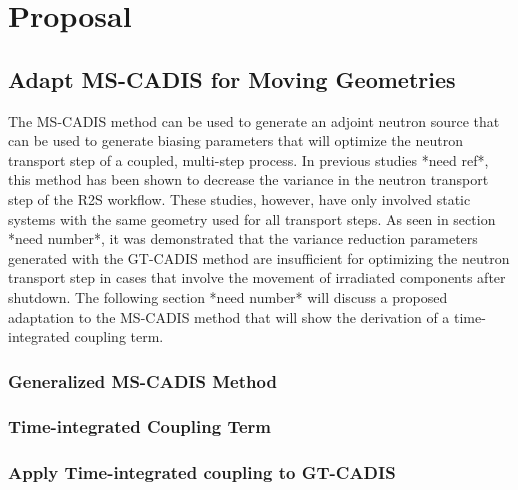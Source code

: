 \chapter{Proposal}\label{ch:proposal}

\section{Adapt MS-CADIS for Moving Geometries}\label{sec:adapt}
The MS-CADIS method can be used to generate an adjoint neutron source 
that can be used to generate biasing parameters that will optimize the neutron transport step of a coupled,
multi-step process. In previous studies *need ref*, this method has been shown to decrease
the variance in the neutron transport step of the R2S workflow.  These studies,
however, have only involved static systems with the same geometry used for all
transport steps.  
As seen in section *need number*, it was demonstrated that the variance
reduction parameters generated with the GT-CADIS method are insufficient for
optimizing the neutron transport step in cases that involve the movement 
of irradiated components after shutdown.  
The following section *need number* will discuss a proposed adaptation to the
MS-CADIS method that will show the derivation of a time-integrated coupling
term.

\subsection{Generalized MS-CADIS Method}

\subsection{Time-integrated Coupling Term}

\subsection{Apply Time-integrated coupling to GT-CADIS}



